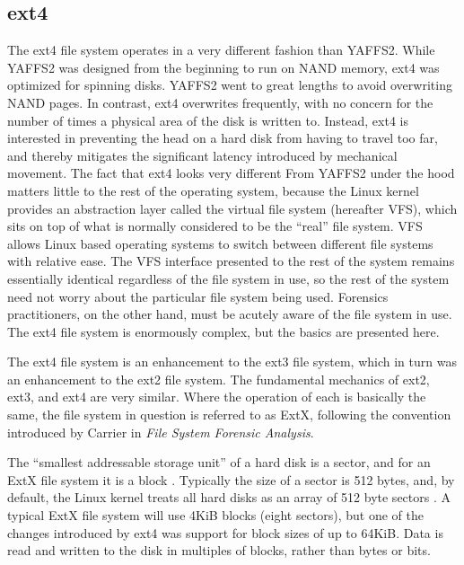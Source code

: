 \subsection{ext4}
The ext4 file system operates in a very different fashion than YAFFS2. While YAFFS2 was designed from the beginning to run on NAND
memory, ext4 was optimized for spinning disks. YAFFS2 went to great lengths to avoid overwriting NAND pages. In contrast, ext4
overwrites frequently, with no concern for the number of times a physical area of the disk is written to. Instead, ext4 is
interested in preventing the head on a hard disk from having to travel too far, and thereby mitigates the significant latency
introduced by mechanical movement. The fact that ext4 looks very different From YAFFS2 under the hood matters little to the rest of
the operating system, because the Linux kernel provides an abstraction layer called the virtual file system (hereafter VFS), which
sits on top of what is normally considered to be the ``real'' file system. VFS allows Linux based operating systems to switch
between different file systems with relative ease. The VFS interface presented to the rest of the system remains essentially
identical regardless of the file system in use, so the rest of the system need not worry about the particular file system being
used. Forensics practitioners, on the other hand, must be acutely aware of the file system in use. The ext4 file system is
enormously complex, but the basics are presented here.

The ext4 file system is an enhancement to the ext3 file system, which in turn was an enhancement to the
ext2 file system. The fundamental mechanics of ext2, ext3, and ext4 are very similar. Where the
operation of each is basically the same, the file system in question is referred to as ExtX, following the convention
introduced by Carrier \citeyear{carrier} in \emph{File System Forensic Analysis}.

The ``smallest addressable storage unit'' of a hard disk is a sector, and for an ExtX file system it is a block
\cite[Chapter 14]{carrier}. Typically the size of a sector is 512 bytes, and, by default, the Linux kernel treats all hard disks as
an array of 512 byte sectors \cite{linuxdrivers}.  A typical ExtX file system will use 4KiB blocks (eight sectors), but one
of the changes introduced by ext4 was support for block sizes of up to 64KiB. Data is read and written to the disk in
multiples of blocks, rather than bytes or bits. 


